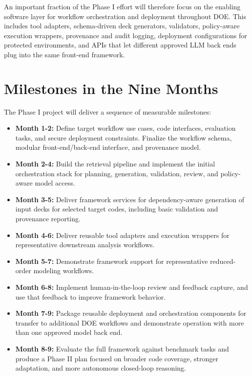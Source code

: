 \documentclass[11pt]{article} \usepackage[margin=1in]{geometry}
\begin{document}
An important fraction of the Phase I effort will therefore focus on the enabling
software layer for workflow orchestration and deployment throughout DOE. This
includes tool adapters, schema-driven deck generators, validators, policy-aware
execution wrappers, provenance and audit logging, deployment configurations for
protected environments, and APIs that let different approved LLM back ends plug
into the same front-end framework.

\section{Milestones in the Nine Months} The Phase I project will deliver a
sequence of measurable milestones:

\begin{itemize} \item \textbf{Month 1-2:} Define target workflow use cases, code
interfaces, evaluation tasks, and secure deployment constraints. Finalize the
workflow schema, modular front-end/back-end interface, and provenance model.
\item \textbf{Month 2-4:} Build the retrieval pipeline and implement the initial
orchestration stack for planning, generation, validation, review, and
policy-aware model access.  \item \textbf{Month 3-5:} Deliver framework services
for dependency-aware generation of input decks for selected target codes,
including basic validation and provenance reporting.  \item \textbf{Month 4-6:}
Deliver reusable tool adapters and execution wrappers for representative
downstream analysis workflows.  \item \textbf{Month 5-7:} Demonstrate framework
support for representative reduced-order modeling workflows.  \item
\textbf{Month 6-8:} Implement human-in-the-loop review and feedback capture, and
use that feedback to improve framework behavior.  \item \textbf{Month 7-9:}
Package reusable deployment and orchestration components for transfer to
additional DOE workflows and demonstrate operation with more than one approved
model back end.  \item \textbf{Month 8-9:} Evaluate the full framework against
benchmark tasks and produce a Phase II plan focused on broader code coverage,
stronger adaptation, and more autonomous closed-loop reasoning.  \end{itemize}
\end{document}
